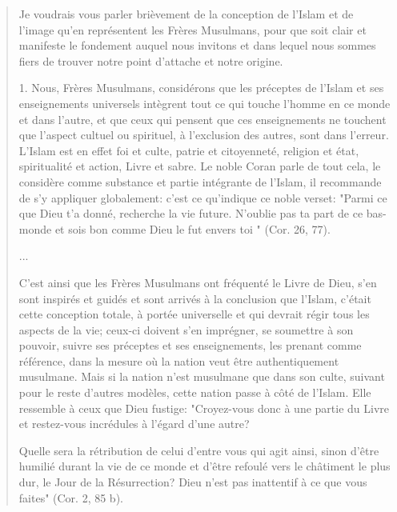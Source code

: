 \begin{quote}
    Je voudrais vous parler brièvement de la conception de l'Islam et de
l'image qu'en représentent les Frères Musulmans, pour que soit clair et
manifeste le fondement auquel nous invitons et dans lequel nous sommes
fiers de trouver notre point d'attache et notre origine.


1.
  Nous, Frères Musulmans, considérons que les préceptes de l'Islam et
  ses enseignements universels intègrent tout ce qui touche l'homme en
  ce monde et dans l'autre, et que ceux qui pensent que ces
  enseignements ne touchent que l'aspect cultuel ou spirituel, à
  l'exclusion des autres, sont dans l'erreur. L'Islam est en effet foi
  et culte, patrie et citoyenneté, religion et état, spiritualité et
  action, Livre et sabre. Le noble Coran parle de tout cela, le
  considère comme substance et partie intégrante de l'Islam, il
  recommande de s'y appliquer globalement: c'est ce qu'indique ce noble
  verset: "Parmi ce que Dieu t'a donné, recherche la vie future.
  N'oublie pas ta part de ce bas-monde et sois bon comme Dieu le fut
  envers toi " (Cor. 26, 77).
  
 

...

C'est ainsi que les Frères Musulmans ont fréquenté le Livre de Dieu,
s'en sont inspirés et guidés et sont arrivés à la conclusion que
l'Islam, c'était cette conception totale, à portée universelle et qui
devrait régir tous les aspects de la vie; ceux-ci doivent s'en
imprégner, se soumettre à son pouvoir, suivre ses préceptes et ses
enseignements, les prenant comme référence, dans la mesure où la nation
veut être authentiquement musulmane. Mais si la nation n'est musulmane
que dans son culte, suivant pour le reste d'autres modèles, cette nation
passe à côté de l'Islam. Elle ressemble à ceux que Dieu fustige:
"Croyez-vous donc à une partie du Livre et restez-vous incrédules à
l'égard d'une autre?

Quelle sera la rétribution de celui d'entre vous qui agit ainsi, sinon
d'être humilié durant la vie de ce monde et d'être refoulé vers le
châtiment le plus dur, le Jour de la Résurrection? Dieu n'est pas
inattentif à ce que vous faites" (Cor. 2, 85 b).



\end{quote}
